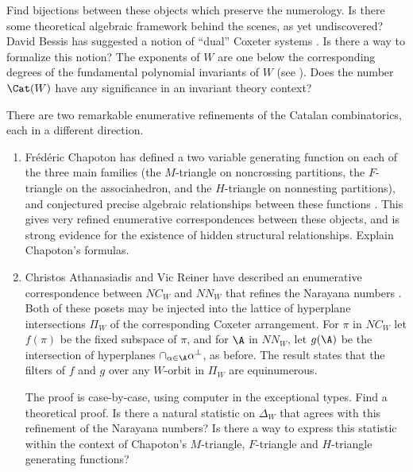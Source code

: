 \begin{problemblock}
\begin{problem}[1.2]
Find bijections between these objects which preserve the numerology. Is
there some theoretical algebraic framework behind the scenes, as
yet undiscovered? David Bessis has suggested a notion of ``dual''
Coxeter systems \cite{bessis:dual}. Is there a way to formalize this
notion? The exponents of $W$ are one below the corresponding degrees of
the fundamental polynomial invariants of $W$ (see \cite{humphries}). Does
the number $\Cat(W)$ have any significance in an invariant theory context?
\end{problem}

\begin{remark}
 There are two remarkable enumerative refinements of the Catalan combinatorics, each in a different direction.
\begin{enumerate}
\item Fr\'ed\'eric Chapoton has defined a two variable generating function
on each of the three main families (the $M$-triangle on noncrossing
partitions, the $F$-triangle on the associahedron, and the $H$-triangle
on nonnesting partitions), and conjectured precise algebraic relationships
between these functions \cite{chapoton:one,chapoton:two}. This gives very
refined enumerative correspondences between these objects, and is strong
evidence for the existence of hidden structural relationships. Explain
Chapoton's formulas.

\item Christos Athanasiadis and Vic Reiner have described an enumerative
correspondence between $NC_W$ and $NN_W$ that refines the Narayana numbers
\cite{athanasiadis-reiner}. Both of these posets may be injected into the
lattice of hyperplane intersections $\Pi_W$ of the corresponding Coxeter
arrangement. For $\pi$ in $NC_W$ let $f(\pi)$ be the fixed subspace
of $\pi$, and for $\A$ in $NN_W$, let $g(\A)$ be the intersection of
hyperplanes $\cap_{\alpha\in\A} \alpha^{\perp}$, as before. The result
states that the filters of $f$ and $g$ over any $W$-orbit in $\Pi_W$
are equinumerous.

The proof is case-by-case, using computer in the exceptional types. Find
a theoretical proof. Is there a natural statistic on $\Delta_W$ that
agrees with this refinement of the Narayana numbers? Is there a way to
express this statistic within the context of Chapoton's $M$-triangle,
$F$-triangle and $H$-triangle generating functions?
\end{enumerate}
\end{remark}


\end{problemblock}
